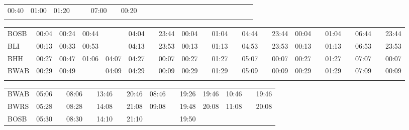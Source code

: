 \begin{center}
\begin{tabular}
\begin{tabular}
\begin{tabular}{!{\color{blaulila}\vrule width 3pt}l!{\color{blaulila}\vrule width 3pt}*{6}{c|}c!{\color{blaulila}\vrule width 3pt}*{2}{*{7}{c|}c!{\color{blaulila}\vrule width 3pt}}}
00:40 & 01:00 & 01:20 &       &          & 07:00 & \bli{}   & 00:20 \\
\myhline
\end{tabular}
\begin{tabular}{!{\color{blaulila}\vrule width 3pt}l!{\color{blaulila}\vrule width 3pt}*{3}{*{6}{c|}c!{\color{blaulila}\vrule width 3pt}}}
\hline
{}
 &  &  \\
\hline
BOSB     &
00:04 & 00:24 & 00:44 &       & 04:04 &  & 23:44 &
00:04 &  & 01:04 &          & 04:44 &  & 23:44 &
00:04 &  & 01:04 &          & 06:44 &  & 23:44 \\
BLI      &
00:13 & 00:33 & 00:53 &       & 04:13 & \bli{}   & 23:53 &
00:13 & \bli{}   & 01:13 &  & 04:53 & \bli{}   & 23:53 &
00:13 & \bli{}   & 01:13 &  & 06:53 & \bli{}   & 23:53 \\
BHH      &
00:27 & 00:47 & 01:06 & 04:07 & 04:27 & \bli{}   & 00:07 &
00:27 & \bli{}   & 01:27 & \bli{}   & 05:07 & \bli{}   & 00:07 &
00:27 & \bli{}   & 01:27 & \bli{}   & 07:07 & \bli{}   & 00:07 \\
BWAB     &
00:29 & 00:49 &       & 04:09 & 04:29 & \bli{}   & 00:09 &
00:29 & \bli{}   & 01:29 & \bli{}   & 05:09 & \bli{}   & 00:09 &
00:29 & \bli{}   & 01:29 & \bli{}   & 07:09 & \bli{}   & 00:09 \\
\myhline
\end{tabular}
\fi
\iftapir
\begin{tabular}{!{\color{blaulila}\vrule width 3pt}l!{\color{blaulila}\vrule width 3pt}*{6}{c|}c!{\color{blaulila}\vrule width 3pt}*{3}{c|}c!{\color{blaulila}\vrule width 3pt}*{2}{c|}c!{\color{blaulila}\vrule width 3pt}}
\hline
{}
 &  &  \\
\hline
BWAB     &
05:06 &  & 08:06 &  & 13:46 &  & 20:46 &
08:46 &  & 19:26 & 19:46 &
10:46 &  & 19:46 \\
BWRS     &
05:28 & \bli{}   & 08:28 & \bli{}   & 14:08 & \bli{}   & 21:08 &
09:08 & \bli{}   & 19:48 & 20:08 &
11:08 & \bli{}   & 20:08 \\
BOSB     &
05:30 & \bli{}   & 08:30 &          & 14:10 & \bli{}   & 21:10 &
      &          & 19:50 &       &
      &          &       \\

\end{tabular}
\end{tabular}
\end{tabular}
\end{center}
